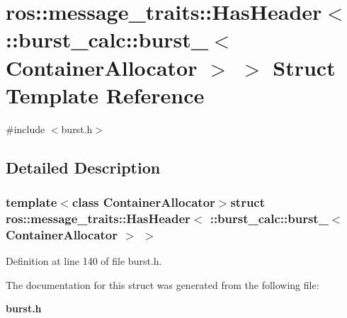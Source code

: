\section{ros\-:\-:message\-\_\-traits\-:\-:\-Has\-Header$<$ \-:\-:burst\-\_\-calc\-:\-:burst\-\_\-$<$ \-Container\-Allocator $>$ $>$ \-Struct \-Template \-Reference}
\label{structros_1_1message__traits_1_1HasHeader_3_01_1_1burst__calc_1_1burst___3_01ContainerAllocator_01_4_01_4}


{\ttfamily \#include $<$burst.\-h$>$}



\subsection{\-Detailed \-Description}
\subsubsection*{template$<$class Container\-Allocator$>$struct ros\-::message\-\_\-traits\-::\-Has\-Header$<$ \-::burst\-\_\-calc\-::burst\-\_\-$<$ Container\-Allocator $>$ $>$}



\-Definition at line 140 of file burst.\-h.



\-The documentation for this struct was generated from the following file\-:\begin{DoxyCompactItemize}
\item 
{\bf burst.\-h}\end{DoxyCompactItemize}
